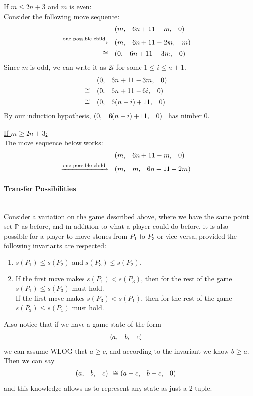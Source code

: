 \documentclass{article}
\makeatletter
\newcommand{\game}[3]{\begin{array}{@{}*6r}(#1, & #2, & #3)\end{array}}
\makeatother
\begin{document}
\bigskip
\underline{If $m \leq 2n + 3$ and $m$ is even:} \\
Consider the following move sequence:
\begin{align*}
  & \game{m}{6n+11-m}{0} \\
  \xrightarrow{\text{one possible child}} \quad & 
  \game{m}{6n+11-2m}{m} \\
  \cong \quad & 
  \game{0}{6n+11-3m}{0} \\
\end{align*}
Since $m$ is odd, we can write it as $2i$ for some $1\leq i\leq n+1$.
\begin{align*}
  & \game{0}{6n+11-3m}{0} \\
  \cong \quad & \game{0}{6n+11-6i}{0} \\
  \cong \quad & \game{0}{6(n-i)+11}{0} \\
\end{align*}
By our induction hypothesis, $\game{0}{6(n-i)+11}{0}$ has nimber $0$.

\bigskip
\underline{If $m \geq 2n + 3$:} \\
The move sequence below works:
\begin{align*}
  & \game{m}{6n+11-m}{0} \\
  \xrightarrow{\text{one possible child}} \quad & 
  \game{m}{m}{6n+11-2m}
\end{align*}
\newpage

\paragraph{Transfer Possibilities}\mbox{}\\
Consider a variation on the game described above, where we have
the same point set $\mathbb{P}$ as before, and in addition to
what a player could do before, it is also possible for a player
to move stones from $P_1$ to $P_3$ or vice versa, provided the
following invariants are respected:
\begin{enumerate}
  \item $s(P_1) \leq s(P_2)$ and $s(P_3) \leq s(P_2)$.
  \item If the first move makes $s(P_1) < s(P_3)$, then for
    the rest of the game $s(P_1) \leq s(P_3)$ must hold. \\
    If the first move makes $s(P_3) < s(P_1)$, then for
    the rest of the game $s(P_3) \leq s(P_1)$ must hold. 
\end{enumerate}
\bigskip

Also notice that if we have a game state of the form
\begin{equation*}
  \game{a}{b}{c}
\end{equation*}
we can assume WLOG that $a \geq c$, and according to the invariant we know
$b \geq a$. Then we can say
\begin{equation*}
  \game{a}{b}{c} \cong \game{a-c}{b-c}{0}
\end{equation*}
and this knowledge allows us to represent any state as just a 2-tuple.
\bigskip
\end{document}
